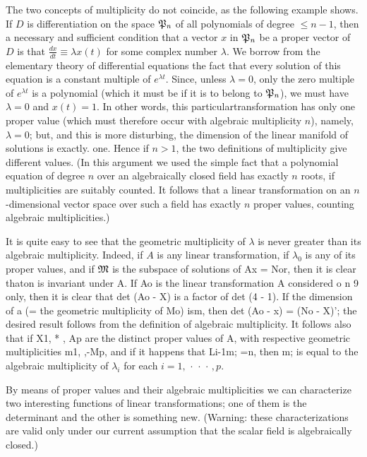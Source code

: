 The two concepts of multiplicity do not coincide, as the following example
shows. If \(D\) is differentiation on the space \(\mathfrak{P}_n\) of all
polynomials of degree \(\leq n - 1\), then a necessary and sufficient condition
that a vector \(x\) in \(\mathfrak{P}_n\) be a proper vector of \(D\) is that
\(\displaystyle \frac{dx}{dt} \equiv \lambda x(t)\) for some complex number
\(\lambda\). We borrow from the elementary theory of differential equations the
fact that every solution of this equation is a constant multiple of \(e^{\lambda
t}\). Since, unless \(\lambda = 0\), only the zero multiple of \(e^{\lambda t}\)
is a polynomial (which it must be if it is to belong to \(\mathfrak{P}_n\)), we must
have \(\lambda = 0\) and \(x(t) = 1\). In other words, this
particulartransformation has only one proper value (which must therefore occur
with algebraic multiplicity \(n\)), namely, \(\lambda = 0\); but, and this is
more disturbing, the dimension of the linear manifold of solutions is exactly.
one. Hence if \(n > 1\), the two definitions of multiplicity give different
values. (In this argument we used the simple fact that a polynomial equation of
degree \(n\) over an algebraically closed field has exactly \(n\) roots, if
multiplicities are suitably counted. It follows that a linear transformation on
an \(n\)-dimensional vector space over such a field has exactly \(n\) proper
values, counting algebraic multiplicities.)

It is quite easy to see that the geometric multiplicity of \(\lambda\) is never
greater than its algebraic multiplicity. Indeed, if \(A\) is any linear
transformation, if \(\lambda_0\) is any of its proper values, and if
\(\frak{M}\) is the subspace of solutions of Ax = Nor, then it is clear thaton
is invariant under A. If Ao is the linear transformation A considered o n 9
only, then it is clear that det (Ao - X) is a factor of det (4 - 1). If the
dimension of a (= the geometric multiplicity of Mo) ism, then det (Ao - x) = (No
- X)'; the desired result follows from the definition of algebraic multiplicity.
It follows also that if X1, * , Ap are the distinct proper values of A, with
respective geometric multiplicities m1, ,-Mp, and if it happens that Li-1m; =n,
then m; is equal to the algebraic multiplicity of \(\lambda_i\) for each  \(i =
1, \,\cdot\,\cdot\,\cdot\,, p\).

By means of proper values and their algebraic multiplicities we can characterize
two interesting functions of linear transformations; one of them is the
determinant and the other is something new. (Warning: these characterizations
are valid only under our current assumption that the scalar field is
algebraically closed.)

